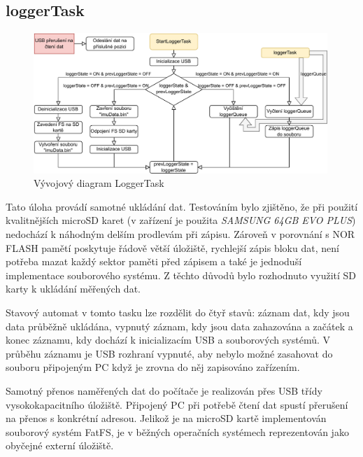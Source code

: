 \subsection{loggerTask}
\begin{figure}[h]
    \centering
    \includegraphics[width=0.99\textwidth]{obrazky/LoggerTask}
    \caption{Vývojový diagram LoggerTask}
\end{figure}
Tato úloha provádí samotné ukládání dat. Testováním bylo zjištěno, že při použití kvalitnějších microSD karet (v zařízení je použita \emph{SAMSUNG 64GB EVO PLUS}) nedochází k náhodným delším prodlevám při zápisu. Zároveň v porovnání s NOR FLASH pamětí poskytuje řádově větší úložiště, rychlejší zápis bloku dat, není potřeba mazat každý sektor paměti před zápisem a také je jednoduší implementace souborového systému. Z těchto důvodů bylo rozhodnuto využití SD karty k ukládání měřených dat.

Stavový automat v tomto tasku lze rozdělit do čtyř stavů: záznam dat, kdy jsou data průběžně ukládána, vypnutý záznam, kdy jsou data zahazována a začátek a konec záznamu, kdy dochází k inicializacím USB a souborových systémů. V průběhu záznamu je USB rozhraní vypnuté, aby nebylo možné zasahovat do souboru připojeným PC když je zrovna do něj zapisováno zařízením.

Samotný přenos naměřených dat do počítače je realizován přes USB třídy vysokokapacitního úložiště. Připojený PC při potřebě čtení dat spustí přerušení na přenos s konkrétní adresou. Jelikož je na microSD kartě implementován souborový systém FatFS, je v běžných operačních systémech reprezentován jako obyčejné externí úložiště.

